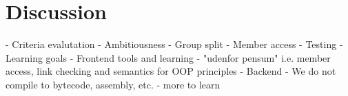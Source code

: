 \chapter{Discussion}

- Criteria evalutation
- Ambitiousness
	- Group split 
	- Member access
- Testing
- Learning goals
	- Frontend tools and learning
		- "udenfor pensum" i.e. member access, link checking and semantics for OOP principles
	- Backend
		- We do not compile to bytecode, assembly, etc. - more to learn
